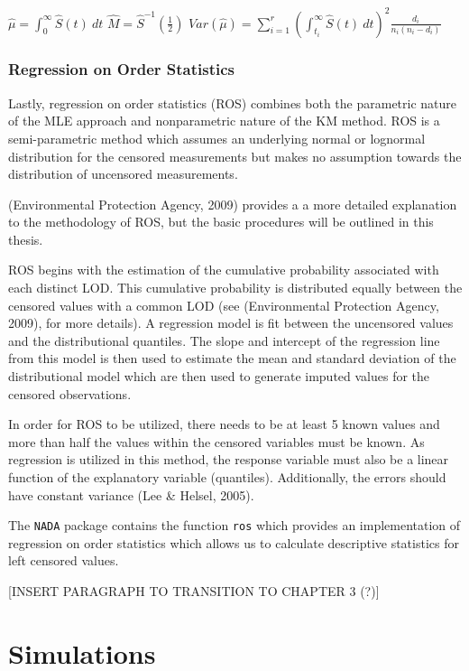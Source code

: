 \documentclass[12pt, twoside]{amherstthesis}
\begin{document}
\(\hat{\mu} = \int_{0}^{\infty} \hat{S}(t) \ dt\)
\(\hat{M} = \hat{S}^{-1} \left (\frac{1}{2} \right)\)
\(Var(\hat{\mu}) = \sum_{i=1}^{r} \left( \int_{t_i}^{\infty}\hat{S}(t) \ dt \right)^2 \frac{d_i}{n_i(n_i - d_i)}\)

\hypertarget{ROS}{%
\subsection{Regression on Order Statistics}\label{ROS}}

Lastly, regression on order statistics (ROS) combines both the parametric nature of the MLE approach and nonparametric nature of the KM method. ROS is a semi-parametric method which assumes an underlying normal or lognormal distribution for the censored measurements but makes no assumption towards the distribution of uncensored measurements.

(Environmental Protection Agency, 2009) provides a a more detailed explanation to the methodology of ROS, but the basic procedures will be outlined in this thesis.

ROS begins with the estimation of the cumulative probability associated with each distinct LOD. This cumulative probability is distributed equally between the censored values with a common LOD (see (Environmental Protection Agency, 2009), for more details). A regression model is fit between the uncensored values and the distributional quantiles. The slope and intercept of the regression line from this model is then used to estimate the mean and standard deviation of the distributional model which are then used to generate imputed values for the censored observations.

In order for ROS to be utilized, there needs to be at least 5 known values and more than half the values within the censored variables must be known. As regression is utilized in this method, the response variable must also be a linear function of the explanatory variable (quantiles). Additionally, the errors should have constant variance (Lee \& Helsel, 2005).

The \texttt{NADA} package contains the function \texttt{ros} which provides an implementation of regression on order statistics which allows us to calculate descriptive statistics for left censored values.

{[}INSERT PARAGRAPH TO TRANSITION TO CHAPTER 3 (?){]}

\hypertarget{simulations}{%
\chapter{Simulations}\label{simulations}}
\end{document}
